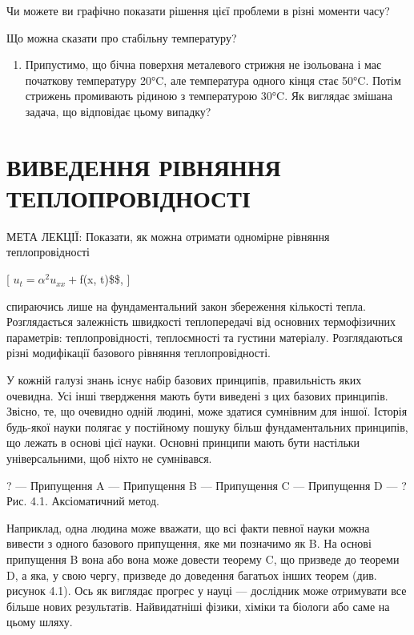 \documentclass[
]{article}
\providecommand{\tightlist}{%
  \setlength{\itemsep}{0pt}\setlength{\parskip}{0pt}}
\begin{document}
Чи можете ви графічно показати рішення цієї проблеми в різні моменти
часу?

Що можна сказати про стабільну температуру?

\begin{enumerate}
\def\labelenumi{\arabic{enumi}.}
\setcounter{enumi}{3}
\tightlist
\item
  Припустимо, що бічна поверхня металевого стрижня не ізольована і має
  початкову температуру 20°C, але температура одного кінця стає 50°C.
  Потім стрижень промивають рідиною з температурою 30°C. Як виглядає
  змішана задача, що відповідає цьому випадку?
\end{enumerate}

\section{ВИВЕДЕННЯ РІВНЯННЯ
ТЕПЛОПРОВІДНОСТІ}\label{ux432ux438ux432ux435ux434ux435ux43dux43dux44f-ux440ux456ux432ux43dux44fux43dux43dux44f-ux442ux435ux43fux43bux43eux43fux440ux43eux432ux456ux434ux43dux43eux441ux442ux456}

МЕТА ЛЕКЦІЇ: Показати, як можна отримати одномірне рівняння
теплопровідності

{[} \(u_t = \alpha^2 u_{xx} +\)f(x, t)\$\$, {]}

спираючись лише на фундаментальний закон збереження кількості тепла.
Розглядається залежність швидкості теплопередачі від основних
термофізичних параметрів: теплопровідності, теплоємності та густини
матеріалу. Розглядаються різні модифікації базового рівняння
теплопровідності.

У кожній галузі знань існує набір базових принципів, правильність яких
очевидна. Усі інші твердження мають бути виведені з цих базових
принципів. Звісно, те, що очевидно одній людині, може здатися сумнівним
для іншої. Історія будь-якої науки полягає у постійному пошуку більш
фундаментальних принципів, що лежать в основі цієї науки. Основні
принципи мають бути настільки універсальними, щоб ніхто не сумнівався.

? --- Припущення A --- Припущення B --- Припущення C --- Припущення D
--- ? Рис. 4.1. Аксіоматичний метод.

Наприклад, одна людина може вважати, що всі факти певної науки можна
вивести з одного базового припущення, яке ми позначимо як B. На основі
припущення B вона або вона може довести теорему C, що призведе до
теореми D, а яка, у свою чергу, призведе до доведення багатьох інших
теорем (див. рисунок 4.1). Ось як виглядає прогрес у науці --- дослідник
може отримувати все більше нових результатів. Найвидатніші фізики,
хіміки та біологи або саме на цьому шляху.
\end{document}
